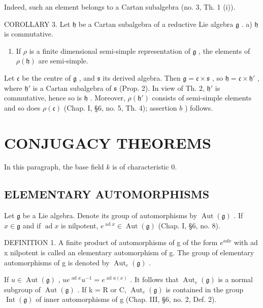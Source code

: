 Indeed, such an element belongs to a Cartan subalgebra (no. 3, Th. 1 (i)).

COROLLARY 3. Let \(\mathfrak{h}\) be a Cartan subalgebra of a reductive Lie algebra \(\mathfrak{g}\) . a) \(\mathfrak{h}\) is commutative.

\begin{enumerate}
\def\labelenumi{\alph{enumi})}
\setcounter{enumi}{1}
\tightlist
\item
  If \(\rho\) is a finite dimensional semi-simple representation of \(\mathfrak{g}\) , the elements of \(\rho(\mathfrak{h})\) are semi-simple.
\end{enumerate}

Let \(\mathfrak{c}\) be the centre of \(\mathfrak{g}\) , and \(\mathfrak{s}\) its derived algebra. Then \(\mathfrak{g} = \mathfrak{c} \times \mathfrak{s}\) , so \(\mathfrak{h} = \mathfrak{c} \times \mathfrak{h}'\) , where \(\mathfrak{h}'\) is a Cartan subalgebra of \(\mathfrak{s}\) (Prop. 2). In view of Th. 2, \(\mathfrak{h}'\) is commutative, hence so is \(\mathfrak{h}\) . Moreover, \(\rho(\mathfrak{h}')\) consists of semi-simple elements and so does \(\rho(\mathfrak{c})\) (Chap. I, §6, no. 5, Th. 4); assertion \(b\) ) follows.

\section{CONJUGACY THEOREMS}

In this paragraph, the base field \(k\) is of characteristic 0.

\subsection{ELEMENTARY AUTOMORPHISMS}

Let \(\mathfrak{g}\) be a Lie algebra. Denote its group of automorphisms by \(\operatorname{Aut}(\mathfrak{g})\) . If \(x \in \mathfrak{g}\) and if \(\operatorname{ad} x\) is nilpotent, \(e^{\operatorname{ad} x} \in \operatorname{Aut}(\mathfrak{g})\) (Chap. I, §6, no. 8).

DEFINITION 1. A finite product of automorphisms of g of the form \(e^{ad x}\) with ad x nilpotent is called an elementary automorphism of g. The group of elementary automorphisms of g is denoted by \(\operatorname{Aut}_{e}(\mathfrak{g})\) .

If \(u \in \operatorname{Aut}(\mathfrak{g})\) , \(ue^{\operatorname{ad}x}u^{-1} = e^{\operatorname{ad}u(x)}\) . It follows that \(\operatorname{Aut}_{e}(\mathfrak{g})\) is a normal subgroup of \(\operatorname{Aut}(\mathfrak{g})\) . If k = R or C, \(\operatorname{Aut}_{e}(\mathfrak{g})\) is contained in the group \(\operatorname{Int}(\mathfrak{g})\) of inner automorphisms of g (Chap. III, §6, no. 2, Def. 2).

